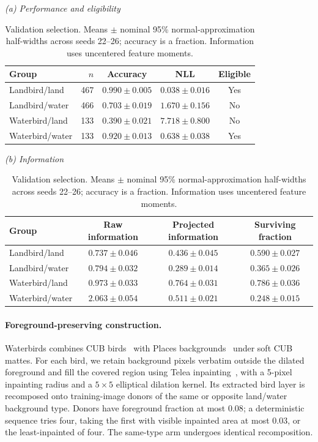 \begin{table}[htbp]
\centering\small
\setlength{\tabcolsep}{3pt}
\caption{Validation selection. Means $\pm$ nominal 95\% normal-approximation half-widths across seeds 22--26; accuracy is a fraction. Information uses uncentered feature moments.}
\label{tab:d-validation-performance}
\label{tab:d-validation-information}
\textit{(a) Performance and eligibility}\par\smallskip
\begin{tabular}{@{}lrccc@{}}
\toprule
Group & $n$ & Accuracy & NLL & Eligible \\
\midrule
Landbird/land & 467 & $0.990\pm0.005$ & $0.038\pm0.016$ & Yes \\
Landbird/water & 466 & $0.703\pm0.019$ & $1.670\pm0.156$ & No \\
Waterbird/land & 133 & $0.390\pm0.021$ & $7.718\pm0.800$ & No \\
Waterbird/water & 133 & $0.920\pm0.013$ & $0.638\pm0.038$ & Yes \\
\bottomrule
\end{tabular}
\par\smallskip
\textit{(b) Information}\par\smallskip
\begin{tabular}{@{}lccc@{}}
\toprule
Group & Raw information & Projected information & Surviving fraction \\
\midrule
Landbird/land & $0.737\pm0.046$ & $0.436\pm0.045$ & $0.590\pm0.027$ \\
Landbird/water & $0.794\pm0.032$ & $0.289\pm0.014$ & $0.365\pm0.026$ \\
Waterbird/land & $0.973\pm0.033$ & $0.764\pm0.031$ & $0.786\pm0.036$ \\
Waterbird/water & $2.063\pm0.054$ & $0.511\pm0.021$ & $0.248\pm0.015$ \\
\bottomrule
\end{tabular}
\par\smallskip
\end{table}


\paragraph{Foreground-preserving construction.}
Waterbirds combines CUB birds~\citep{wah2011cub} with Places backgrounds~\citep{zhou2018places} under soft CUB mattes. For each bird, we retain background pixels verbatim outside the dilated foreground and fill the covered region using Telea inpainting~\mbox{\citep{telea2004image}}, with a 5-pixel inpainting radius and a $5\times5$ elliptical dilation kernel. Its extracted bird layer is recomposed onto training-image donors of the same or opposite land/water background type. Donors have foreground fraction at most $0.08$; a deterministic sequence tries four, taking the first with visible inpainted area at most $0.03$, or the least-inpainted of four. The same-type arm undergoes identical recomposition.

